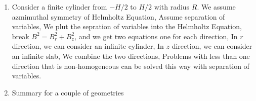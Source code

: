 \documentclass{school-22.211-notes}
\begin{document}
\begin{enumerate}
\begin{enumerate}
  \item Consider a finite cylinder from $-H/2$ to $H/2$ with radius $R$. We assume azmimuthal symmetry of Helmholtz Equation, 
    Assume separation of variables,
    We plut the sepration of variables into the Helmholtz Equation, break $B^2 = B_r^2 + B_z^2$, and we get two equations one for each direction, 
    In $r$ direction, we can consider an infinite cylinder, 
    In $z$ direction, we can consider an infinite slab,
    We combine the two directions,
    Problems with less than one direction that is non-homogeneous can be solved this way with separation of variables.

  \item Summary for a couple of geometries
    \begin{table}[ht]
      \small
      \caption{Finite Geometries With Zero Flux BC} \label{diffusion-table}
    \end{table}


\end{enumerate}
\end{enumerate}
\end{document}
